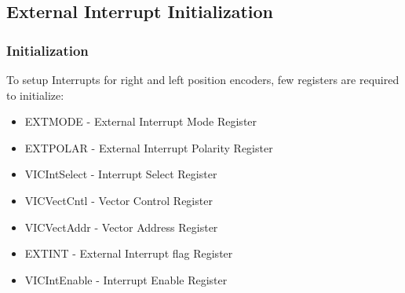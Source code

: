 \documentclass[table,10pt,red]{beamer}
\begin{document}
\subsection{External Interrupt Initialization}
	\begin{frame}
		\frametitle{Initialization} 
		To setup Interrupts for right and left position encoders, few registers are required to initialize:  \pause
		\begin{itemize}
			\item EXTMODE - External Interrupt Mode Register\pause
			\item EXTPOLAR - External Interrupt Polarity Register\pause
			\item VICIntSelect - Interrupt Select Register\pause
			\item VICVectCntl - Vector Control Register \pause
			\item VICVectAddr - Vector Address Register \pause
			\item EXTINT - External Interrupt flag Register\pause
			\item VICIntEnable - Interrupt Enable Register\pause
			
		\end{itemize} 
	\end{frame}
	
\end{document}
